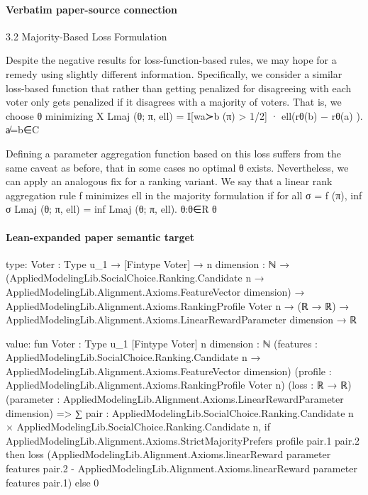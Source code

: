 \documentclass[10pt]{article}
\begin{document}
\paragraph{Verbatim paper-source connection}
\begin{ReviewVerbatim}
3.2   Majority-Based Loss Formulation

Despite the negative results for loss-function-based rules, we may hope for a remedy using slightly
different information. Specifically, we consider a similar loss-based function that rather than getting
penalized for disagreeing with each voter only gets penalized if it disagrees with a majority of voters.
That is, we choose θ minimizing
                                       X
                    Lmaj (θ; π, ell) =         I[wa≻b (π) > 1/2] · ell(rθ(b) − rθ(a) ).
                                       a̸=b∈C

Defining a parameter aggregation function based on this loss suffers from the same caveat as before,
that in some cases no optimal θ exists. Nevertheless, we can apply an analogous fix for a ranking
variant. We say that a linear rank aggregation rule f minimizes ell in the majority formulation if for
all σ = f (π),
                               inf σ Lmaj (θ; π, ell) = inf Lmaj (θ; π, ell).
                               θ:θ∈R                      θ
\end{ReviewVerbatim}



\paragraph{Lean-expanded paper semantic target}
\begin{ReviewVerbatim}
type:
{Voter : Type u_1} →
  [Fintype Voter] →
    {n dimension : ℕ} →
      (AppliedModelingLib.SocialChoice.Ranking.Candidate n →
          AppliedModelingLib.Alignment.Axioms.FeatureVector dimension) →
        AppliedModelingLib.Alignment.Axioms.RankingProfile Voter n →
          (ℝ → ℝ) → AppliedModelingLib.Alignment.Axioms.LinearRewardParameter dimension → ℝ

value:
fun {Voter : Type u_1} [Fintype Voter] {n dimension : ℕ}
    (features :
      AppliedModelingLib.SocialChoice.Ranking.Candidate n → AppliedModelingLib.Alignment.Axioms.FeatureVector dimension)
    (profile : AppliedModelingLib.Alignment.Axioms.RankingProfile Voter n) (loss : ℝ → ℝ)
    (parameter : AppliedModelingLib.Alignment.Axioms.LinearRewardParameter dimension) =>
  ∑ pair : AppliedModelingLib.SocialChoice.Ranking.Candidate n × AppliedModelingLib.SocialChoice.Ranking.Candidate n,
    if AppliedModelingLib.Alignment.Axioms.StrictMajorityPrefers profile pair.1 pair.2 then
      loss
        (AppliedModelingLib.Alignment.Axioms.linearReward parameter features pair.2 -
          AppliedModelingLib.Alignment.Axioms.linearReward parameter features pair.1)
    else 0
\end{ReviewVerbatim}
\end{document}
